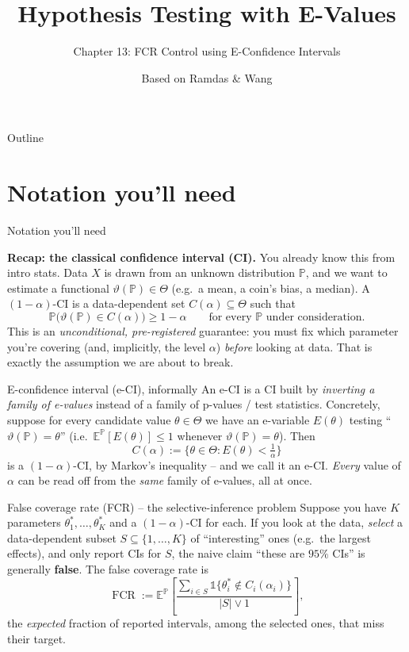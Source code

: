 \documentclass[aspectratio=169,10pt]{beamer}
\title[E-Values -- Ch.13]{Hypothesis Testing with E-Values}
\subtitle{Chapter 13: FCR Control using E-Confidence Intervals}
\author{Based on Ramdas \& Wang}
\date{}
\newcommand{\E}{\mathbb{E}}
\newcommand{\Pb}{\mathbb{P}}
\newcommand{\Theset}{\Theta}
\DeclareMathOperator{\FCR}{FCR}
\begin{document}
\begin{frame}
  \titlepage
\end{frame}

\begin{frame}[allowframebreaks]{Outline}
  \tableofcontents
\end{frame}

\section{Notation you'll need}

\begin{frame}[allowframebreaks]{Notation you'll need}

  \textbf{Recap: the classical confidence interval (CI).} You already know this from intro stats. Data $X$ is drawn from an unknown distribution $\Pb$, and we want to estimate a functional $\vartheta(\Pb) \in \Theset$ (e.g.\ a mean, a coin's bias, a median). A $(1-\alpha)$-CI is a data-dependent set $C(\alpha) \subseteq \Theset$ such that
  \[
    \Pb\big(\vartheta(\Pb) \in C(\alpha)\big) \geq 1-\alpha \qquad \text{for every } \Pb \text{ under consideration.}
  \]
  This is an \emph{unconditional, pre-registered} guarantee: you must fix which parameter you're covering (and, implicitly, the level $\alpha$) \emph{before} looking at data. That is exactly the assumption we are about to break.

  \framebreak

  \begin{block}{E-confidence interval (e-CI), informally}
    An e-CI is a CI built by \emph{inverting a family of e-values} instead of a family of p-values / test statistics. Concretely, suppose for every candidate value $\theta \in \Theset$ we have an e-variable $E(\theta)$ testing ``$\vartheta(\Pb) = \theta$'' (i.e.\ $\E^{\Pb}[E(\theta)] \leq 1$ whenever $\vartheta(\Pb)=\theta$). Then
    \[
      C(\alpha) := \Big\{ \theta \in \Theset : E(\theta) < \tfrac{1}{\alpha} \Big\}
    \]
    is a $(1-\alpha)$-CI, by Markov's inequality -- and we call it an e-CI. \emph{Every} value of $\alpha$ can be read off from the \emph{same} family of e-values, all at once.
  \end{block}

  \framebreak

  \begin{block}{False coverage rate (FCR) -- the selective-inference problem}
    Suppose you have $K$ parameters $\theta_1^*,\dots,\theta_K^*$ and a $(1-\alpha)$-CI for each. If you look at the data, \emph{select} a data-dependent subset $S \subseteq \{1,\dots,K\}$ of ``interesting'' ones (e.g.\ the largest effects), and only report CIs for $S$, the naive claim ``these are $95\%$ CIs'' is generally \textbf{false}. The false coverage rate is
    \[
      \FCR := \E^{\Pb}\left[ \frac{\sum_{i \in S} \mathbb{1}\{\theta_i^* \notin C_i(\alpha_i)\}}{|S| \vee 1} \right],
    \]
    the \emph{expected} fraction of reported intervals, among the selected ones, that miss their target.
  \end{block}


\end{frame}
\end{document}
